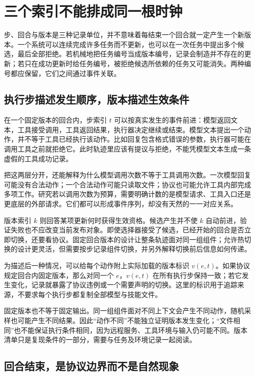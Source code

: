 

\section{三个索引不能排成同一根时钟}
\label{sec:ch02-index-boundaries}

步、回合与版本是三种记录单位，并不意味着每结束一个回合就一定产生一个新版本。一个系统可以连续完成许多任务而不更新，也可以在一次任务中提出多个候选，最后全部拒绝。若机械地把任务编号当成版本编号，记录会制造并不存在的更新；若只在成功更新时给任务编号，被拒绝候选所依赖的任务又可能消失。两种编号都应保留，它们之间通过事件关联。

\subsection{执行步描述发生顺序，版本描述生效条件}

在一个固定版本的回合内，步索引 $t$ 可以按真实发生的事件前进：模型返回文本，工具接受调用，工具返回结果，执行器决定继续或结束。模型文本提出一个动作，并不等于工具已经执行该动作。比如回复包含格式错误的参数，执行器可能在调用工具之前就拒绝它。此时轨迹里应该有提议与拒绝，不能凭模型文本生成一条虚假的工具成功记录。

把这两层分开，还能解释为什么模型调用次数不等于工具调用次数。一次模型回复可能没有合法动作；一个合法动作可能只读取文件；协议也可能允许工具内部完成多项工作。研究若以调用次数为预算，需要明确计数的是模型请求、工具入口还是更底层的外部请求。它们都可以形成事件序列，却没有天然的一一对应关系。

版本索引 $k$ 则回答某项更新何时获得生效资格。候选产生并不使 $k$ 自动前进，验证失败也不应改变当前发布对象。即使选择器接受了候选，已经开始的回合是否立即切换，还要看协议。固定回合版本的设计让整条轨迹面对同一组组件；允许热切换的设计更灵活，但需要按步记录组件切换，并另外解释切换前后信息如何传递。

为描述后一种情况，可以给每个动作附上实际加载的版本标识 $v(e,t)$。如果协议规定回合内固定版本，那么对同一个 $e$，$v(e,t)$ 在所有执行步保持一致；若它发生变化，记录就暴露了协议违例或一个需要声明的切换。这里的标识用于追踪来源，不要求每个执行步都复制全部模型与技能文件。

固定版本也不等于固定输出。同一组组件面对不同上下文会产生不同动作，随机采样也可能产生不同结果。因此“动作不同”不能独立证明版本发生变化；“文件相同”也不能保证执行条件相同，因为远程服务、工具环境与输入仍可能不同。版本清单只是复现条件的一部分，需要与任务及环境记录一起阅读。

\subsection{回合结束，是协议边界而不是自然现象}

